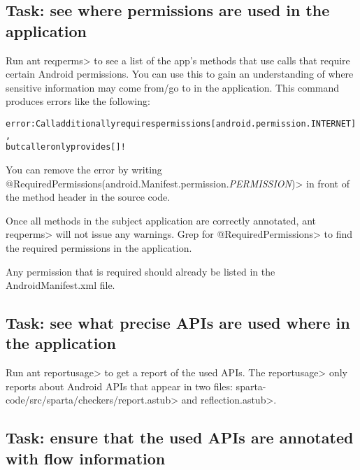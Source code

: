 \subsection{Task: see where permissions are used in the application}

Run \<ant reqperms>  to see a list of the app's methods
that use calls that require certain Android permissions. You can use
this to gain an understanding of where sensitive information may come
from/go to in the application. This command produces errors like the following:
\begin{alltt}
error: Call additionally requires permissions [android.permission.INTERNET], 
   but caller only provides []!
\end{alltt}
You can remove the error by writing
\<@RequiredPermissions({android.Manifest.permission.\emph{PERMISSION}})> in front of the method header in the source code.

Once all methods in the subject application are correctly annotated,
\<ant reqperms> will not issue any warnings.
Grep for \<@RequiredPermissions> to find the required permissions
in the application.

Any permission that is required should already be listed in the AndroidManifest.xml file. 






\subsection{Task: see what precise APIs are used where in the application}

Run \<ant reportusage> to get a report of the used APIs. The
\<reportusage>  only reports about Android APIs that appear in two files:
\<sparta-code/src/sparta/checkers/report.astub> and \<reflection.astub>. 


\subsection{Task: ensure that the used APIs are annotated with flow information\label{flow-task-annotate-apis}}

